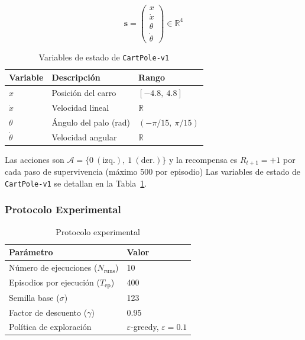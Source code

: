 \begin{equation}
  \mathbf{s} = \begin{pmatrix} x \\ \dot{x} \\ \theta \\ \dot{\theta} \end{pmatrix} \in \mathbb{R}^4
\end{equation}

\begin{table}[htb!]
\caption{Variables de estado de \texttt{CartPole-v1}}\label{tab:cartpole}
\centering\small
\setlength{\tabcolsep}{4pt}
\begin{tabular}{@{}lll@{}}
\toprule
\textbf{Variable} & \textbf{Descripción} & \textbf{Rango} \\
\midrule
$x$ & Posición del carro & $[-4.8,\ 4.8]$ \\
$\dot{x}$ & Velocidad lineal & $\mathbb{R}$ \\
$\theta$ & Ángulo del palo (rad) & $(-\pi/15,\ \pi/15)$ \\
$\dot{\theta}$ & Velocidad angular & $\mathbb{R}$ \\
\bottomrule
\end{tabular}
\end{table}

Las acciones son $\mathcal{A} = \{0\ (\text{izq.}),\ 1\ (\text{der.})\}$ y la recompensa es $R_{t+1} = +1$ por cada paso de supervivencia (máximo 500 por episodio) Las variables de estado de \texttt{CartPole-v1} se detallan en la Tabla~\ref{tab:cartpole}.

\subsubsection{Protocolo Experimental}

\begin{table}[htb!]
\caption{Protocolo experimental}\label{tab:protocolo}
\centering
\begin{tabular}{@{}ll@{}}
\toprule
\textbf{Parámetro} & \textbf{Valor} \\
\midrule
Número de ejecuciones ($N_\text{runs}$) & 10 \\
Episodios por ejecución ($T_\text{ep}$) & 400 \\
Semilla base ($\sigma$) & 123 \\
Factor de descuento ($\gamma$) & 0.95 \\
Política de exploración & $\varepsilon$-greedy, $\varepsilon = 0.1$ \\
\bottomrule
\end{tabular}
\end{table}

